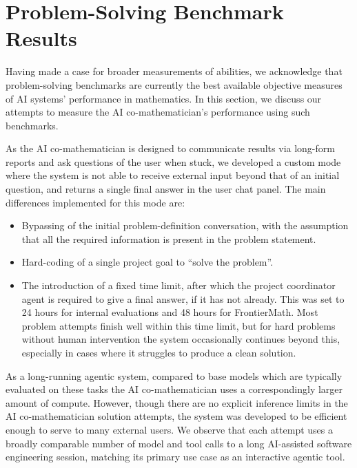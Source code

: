 \documentclass[11pt, a4paper, copyright, gdm]{google}
\begin{document}
\section{Problem-Solving Benchmark Results}
\label{sec:benchmarks}

Having made a case for broader measurements of abilities, we acknowledge that problem-solving benchmarks are currently the best available objective measures of AI systems' performance in mathematics.
In this section, we discuss our attempts to measure the AI co-mathematician's performance using such benchmarks.

As the AI co-mathematician is designed to communicate results via long-form reports and ask questions of the user when stuck, we developed a custom mode where the system is not able to receive external input beyond that of an initial question, and returns a single final answer in the user chat panel.
The main differences implemented for this mode are:
\begin{itemize}
    \item Bypassing of the initial problem-definition conversation, with the assumption that all the required information is present in the problem statement.
    \item Hard-coding of a single project goal to ``solve the problem''.
    \item 
    \begin{minipage}[t]{\linewidth}
    The introduction of a fixed time limit, after which the project coordinator agent is required to give a final answer, if it has not already. This was set to 24 hours for internal evaluations and 48 hours for FrontierMath.
    Most problem attempts finish well within this time limit, but for hard problems without human intervention the system occasionally continues beyond this, especially in cases where it struggles to produce a clean solution.
    \end{minipage}
\end{itemize}

As a long-running agentic system, compared to base models which are typically evaluated on these tasks the AI co-mathematician uses a correspondingly larger amount of compute. However, though there are no explicit inference limits in the AI co-mathematician solution attempts, the system was developed to be efficient enough to serve to many external users. We observe that each attempt uses a broadly comparable number of model and tool calls to a long AI-assisted software engineering session, matching its primary use case as an interactive agentic tool.
\end{document}
